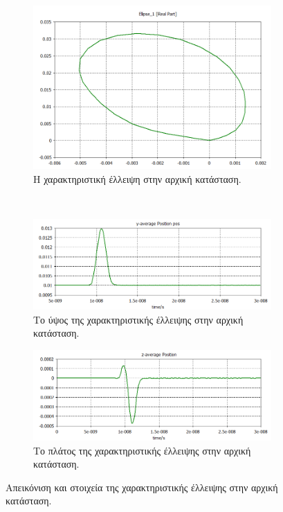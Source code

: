 \begin{figure}[tph]	
\centering
	\begin{subfigure}{0.7\textwidth}
		\includegraphics[width=\linewidth]{figures/CST-variable-analysis/CST-initial-ellipse}
		\centering
		\caption{Η χαρακτηριστική έλλειψη στην αρχική κατάσταση.}
		\label{fig:CST-variable-analysis-initial-ellipse}
	\end{subfigure}
	~
	\begin{subfigure}{0.47\textwidth}
		\includegraphics[width=\linewidth]{figures/CST-variable-analysis/CST-initial-ellipse-height}
		\centering
		\caption{Το ύψος της χαρακτηριστικής έλλειψης στην αρχική κατάσταση.}
		\label{fig:CST-variable-analysis-initial-ellipse-height}
	\end{subfigure}
	\hfill
	\begin{subfigure}{0.47\textwidth}
		\includegraphics[width=\linewidth]{figures/CST-variable-analysis/CST-initial-ellipse-width}
		\centering
		\caption{Το πλάτος της χαρακτηριστικής έλλειψης στην αρχική κατάσταση.}
		\label{fig:CST-variable-analysis-initial-ellipse-width}
	\end{subfigure}	
\caption{Απεικόνιση και στοιχεία της χαρακτηριστικής έλλειψης στην αρχική κατάσταση.}
\label{fig:CST-initial-ellipse}
\end{figure}


